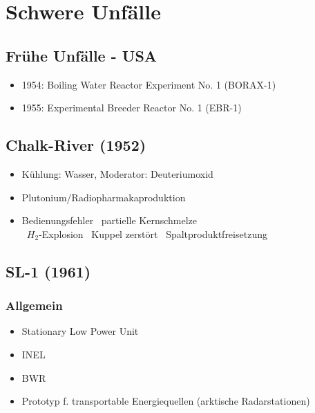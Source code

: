 \documentclass[12pt]{article}
\begin{document}
\section{Schwere Unfälle}

\subsection{Frühe Unfälle - USA}
\begin{itemize}[noitemsep]
	\item 1954: Boiling Water Reactor Experiment No. 1 (BORAX-1)
	\item 1955: Experimental Breeder Reactor No. 1 (EBR-1)
\end{itemize}

\subsection{Chalk-River (1952)}
\begin{itemize}[noitemsep]
	\item Kühlung: Wasser, Moderator: Deuteriumoxid
	\item Plutonium/Radiopharmakaproduktion
	\item Bedienungsfehler \textrightarrow\ partielle Kernschmelze\\
		\textrightarrow\ \(H_2\)-Explosion \textrightarrow\ Kuppel zerstört \textrightarrow\ Spaltproduktfreisetzung
\end{itemize}

\subsection{SL-1 (1961)}

\subsubsection{Allgemein}
\begin{itemize}[noitemsep]
	\item Stationary Low Power Unit
	\item INEL
	\item BWR
	\item Prototyp f. transportable Energiequellen (arktische Radarstationen)
\end{itemize}
\end{document}
